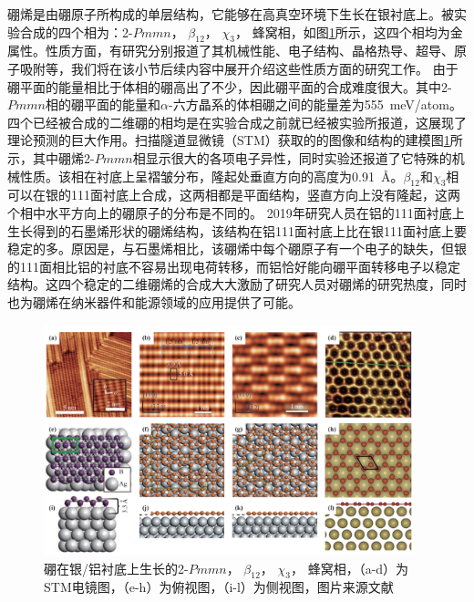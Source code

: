 硼烯是由硼原子所构成的单层结构，它能够在高真空环境下生长在银衬底上\cite{zhang2015two}。被实验合成的四个相为：2-$Pmmn$， $\beta_{12}$， $\chi_3$， 蜂窝相，如图\ref{fig:boron4phase}所示，这四个相均为金属性。性质方面，有研究分别报道了其机械性能、电子结构、晶格热导、超导、原子吸附等\cite{penev2016can, xu2016nucleation, lopez2016electronic, peng2016electronic, carrete2016physically, wang2016strain, xiao2016enhanced, gao2017prediction, liu2016stable, yang2008ab, zabolotskiy2016strain, yuan2015effect, liu2013boron, zhang2016borophene, shu2016unveiling}，我们将在该小节后续内容中展开介绍这些性质方面的研究工作。
由于硼平面的能量相比于体相的硼高出了不少，因此硼平面的合成难度很大。其中2-$Pmmn$相的硼平面的能量和$\alpha$-六方晶系的体相硼之间的能量差为\SI{555}{\meV/atom}\cite{lherbier2016electronic}。四个已经被合成的二维硼的相均是在实验合成之前就已经被实验所报道，这展现了理论预测的巨大作用。扫描隧道显微镜（STM）获取的的图像和结构的建模图\ref{fig:boron4phase}所示，其中硼烯2-$Pmmn$相显示很大的各项电子异性，同时实验还报道了它特殊的机械性质。该相在衬底上呈褶皱分布，隆起处垂直方向的高度为\SI{0.91}{\angstrom}。$\beta_{12}$和$\chi_3$相可以在银的111面衬底上合成，这两相都是平面结构，竖直方向上没有隆起，这两个相中水平方向上的硼原子的分布是不同的。
2019年研究人员在铝的111面衬底上生长得到的石墨烯形状的硼烯结构\cite{li2018experimental}，该结构在铝111面衬底上比在银111面衬底上要稳定的多。原因是，与石墨烯相比，该硼烯中每个硼原子有一个电子的缺失，但银的111面相比铝的衬底不容易出现电荷转移，而铝恰好能向硼平面转移电子以稳定结构。这四个稳定的二维硼烯的合成大大激励了研究人员对硼烯的研究热度，同时也为硼烯在纳米器件和能源领域的应用提供了可能。

\begin{figure}
  \includegraphics[width=0.96\textwidth]{figs/ch1_boron4phase.png}
  \centering
  \caption{硼在银/铝衬底上生长的2-$Pmmn$， $\beta_{12}$， $\chi_3$， 蜂窝相，（a-d）为STM电镜图，（e-h）为俯视图，（i-l）为侧视图，图片来源文献\cite{mannix2015synthesis,li2018experimental,feng2016experimental}}
  \label{fig:boron4phase}
\end{figure}

